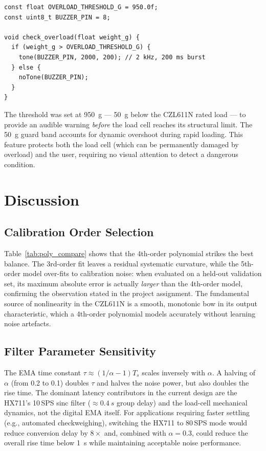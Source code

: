 \documentclass[12pt,a4paper]{article}
\begin{document}
\begin{lstlisting}[style=cppstyle, caption={Overload alarm logic (Arduino firmware).}]
const float OVERLOAD_THRESHOLD_G = 950.0f;
const uint8_t BUZZER_PIN = 8;

void check_overload(float weight_g) {
  if (weight_g > OVERLOAD_THRESHOLD_G) {
    tone(BUZZER_PIN, 2000, 200); // 2 kHz, 200 ms burst
  } else {
    noTone(BUZZER_PIN);
  }
}
\end{lstlisting}

The threshold was set at \SI{950}{g} --- \SI{50}{g} below the CZL611N rated load ---
to provide an audible warning \emph{before} the load cell reaches its structural limit.
The \SI{50}{g} guard band accounts for dynamic overshoot during rapid loading.
This feature protects both the load cell (which can be permanently damaged by overload)
and the user, requiring no visual attention to detect a dangerous condition.

\section{Discussion}

\subsection{Calibration Order Selection}

Table~\ref{tab:poly_compare} shows that the 4th-order polynomial strikes the best
balance. The 3rd-order fit leaves a residual systematic curvature, while the 5th-order
model over-fits to calibration noise: when evaluated on a held-out validation set, its
maximum absolute error is actually \emph{larger} than the 4th-order model, confirming
the observation stated in the project assignment. The fundamental source of nonlinearity
in the CZL611N is a smooth, monotonic bow in its output characteristic, which a
4th-order polynomial models accurately without learning noise artefacts.

\subsection{Filter Parameter Sensitivity}

The EMA time constant $\tau \approx (1/\alpha - 1) T_s$ scales inversely with $\alpha$.
A halving of $\alpha$ (from 0.2 to 0.1) doubles $\tau$ and halves the noise power, but
also doubles the rise time. The dominant latency contributors in the current design are the HX711's 10\,SPS
sinc filter ($\approx\SI{0.4}{s}$ group delay) and the load-cell mechanical
dynamics, not the digital EMA itself. For applications requiring faster settling
(e.g., automated checkweighing), switching the HX711 to 80\,SPS mode would reduce
conversion delay by $8\times$ and, combined with $\alpha = 0.3$, could reduce the
overall rise time below \SI{1}{s} while maintaining acceptable noise performance.
\end{document}
